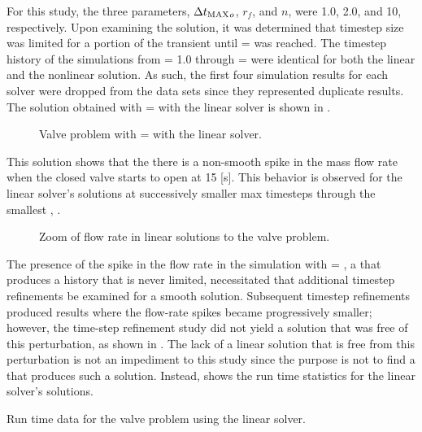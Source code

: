 For this study, the three parameters, $\dtmax{}_{o}$, $r_{f}$, and $n$, were 1.0, 2.0, and 10, respectively.
Upon examining the solution, it was determined that timestep size was \dtcrnt{} limited for a portion of the transient until \dtmax{} =  was reached.
The timestep history of the simulations from \dtmax{} = 1.0 through \dtmax{} =  were identical for both the linear and the nonlinear solution.
As such, the first four simulation results for each solver were dropped from the data sets since they represented duplicate results.
The solution obtained with \dtmax{} =  with the linear solver is shown in .

\begin{figure}[h!tb]
\centering

\caption{Valve problem with \dtmax{} =  with the linear solver.}
\label{fig:valveLin6pt25em02}
\end{figure}

This solution shows that the there is a non-smooth spike in the mass flow rate when the closed valve starts to open at 15 [s].
This behavior is observed for the linear solver's solutions at successively smaller max timesteps through the smallest \dtmax{}, .

\begin{figure}[h!tb]
\centering

\label{fig:valveLinSols}
\caption{Zoom of flow rate in linear solutions to the valve problem.}
\end{figure}

The presence of the spike in the flow rate in the simulation with \dtmax{} = , a \dtmax{} that produces a \dt{} history that is never \dtcrnt{} limited, necessitated that additional timestep refinements be examined for a smooth solution.
Subsequent timestep refinements produced results where the flow-rate spikes became progressively smaller; however, the time-step refinement study did not yield a solution that was free of this perturbation, as shown in .
The lack of a linear solution that is free from this perturbation is not an impediment to this study since the purpose is not to find a \dtmax{} that produces such a solution.
Instead,  shows the run time statistics for the linear solver's solutions.

\begin{table}[h!tb]
\centering
\singlespace

\caption{Run time data for the valve problem using the linear solver.}
\label{tab:valveLinTable}
\end{table}

